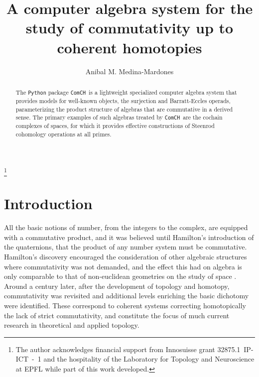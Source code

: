 \documentclass{amsart}
\newcommand{\comch}{\texttt{ComCH}}
\begin{document}
\title[A C.A.S. for the study of commutativity up to coherent homotopies]{A computer algebra system for the study of commutativity up to coherent homotopies}
\author{Anibal M. Medina-Mardones}
\address{Max Plank Institute for Mathematics, Bonn, Germany}
\address{Department of Mathematics, University of Notre Dame, Notre Dame, IN, USA}
\thanks{The author acknowledges financial support from Innosuisse grant \mbox{32875.1 IP-ICT - 1} and the hospitality of the Laboratory for Topology and Neuroscience at EPFL while part of this work developed.}

\begin{abstract}
	The \texttt{Python} package \comch\, is a lightweight specialized computer algebra system that provides models for well-known objects, the surjection and Barratt-Eccles operads, parameterizing the product structure of algebras that are commutative in a derived sense.
	The primary examples of such algebras treated by \comch\, are the cochain complexes of spaces, for which it provides effective constructions of Steenrod cohomology operations at all primes.
\end{abstract}

\vspace*{-.8cm}

\maketitle

\section{Introduction}

All the basic notions of number, from the integers to the complex, are equipped with a commutative product, and it was believed until Hamilton's introduction of the quaternions, that the product of any number system must be commutative.
Hamilton's discovery encouraged the consideration of other algebraic structures where commutativity was not demanded, and the effect this had on algebra is only comparable to that of non-euclidean geometries on the study of space \cite[Ch.V]{Kline1982}.
Around a century later, after the development of topology and homotopy, commutativity was revisited and additional levels enriching the basic dichotomy were identified.
These correspond to coherent systems correcting homotopically the lack of strict commutativity, and constitute the focus of much current research in theoretical and applied topology.
\end{document}
